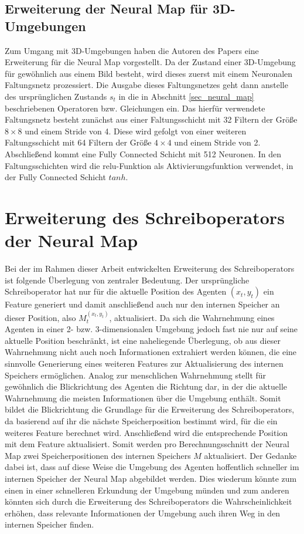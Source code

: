 \subsection{Erweiterung der Neural Map für 3D-Umgebungen}
\label{sec_nm_3d_ext}

Zum Umgang mit 3D-Umgebungen haben die Autoren des Papers eine Erweiterung für die Neural Map vorgestellt. Da der Zustand einer 3D-Umgebung für gewöhnlich aus einem Bild besteht, wird dieses zuerst mit einem Neuronalen Faltungsnetz prozessiert. Die Ausgabe dieses Faltungsnetzes geht dann anstelle des ursprünglichen Zustands $s_t$ in die in Abschnitt \ref{sec_neural_map} beschriebenen Operatoren bzw. Gleichungen ein. Das hierfür verwendete Faltungsnetz besteht zunächst aus einer Faltungsschicht mit 32 Filtern der Größe $8 \times 8$ und einem Stride von 4. Diese wird gefolgt von einer weiteren Faltungsschicht mit 64 Filtern der Größe $4 \times 4$ und einem Stride von 2. Abschließend kommt eine Fully Connected Schicht mit 512 Neuronen. In den Faltungsschichten wird die relu-Funktion als Aktivierungsfunktion verwendet, in der Fully Connected Schicht $tanh$.


\section{Erweiterung des Schreiboperators der Neural Map}
\label{sec_write_ext}

Bei der im Rahmen dieser Arbeit entwickelten Erweiterung des Schreiboperators ist folgende Überlegung von zentraler Bedeutung. Der ursprüngliche Schreiboperator hat nur für die aktuelle Position des Agenten $(x_t,y_t)$ ein Feature generiert und damit anschließend auch nur den internen Speicher an dieser Position, also $M_t^{(x_t,y_t)}$, aktualisiert. Da sich die Wahrnehmung eines Agenten in einer 2- bzw. 3-dimensionalen Umgebung jedoch fast nie nur auf seine aktuelle Position beschränkt, ist eine naheliegende Überlegung, ob aus dieser Wahrnehmung nicht auch noch Informationen extrahiert werden können, die eine sinnvolle Generierung eines weiteren Features zur Aktualisierung des internen Speichers ermöglichen. Analog zur menschlichen Wahrnehmung stellt für gewöhnlich die Blickrichtung des Agenten die Richtung dar, in der die aktuelle Wahrnehmung die meisten Informationen über die Umgebung enthält. Somit bildet die Blickrichtung die Grundlage für die Erweiterung des Schreiboperators, da basierend auf ihr die nächste Speicherposition bestimmt wird, für die ein weiteres Feature berechnet wird. Anschließend wird die entsprechende Position mit dem Feature aktualisiert. Somit werden pro Berechnungsschnitt der Neural Map zwei Speicherpositionen des internen Speichers $M$ aktualisiert. Der Gedanke dabei ist, dass auf diese Weise die Umgebung des Agenten hoffentlich schneller im internen Speicher der Neural Map abgebildet werden. Dies wiederum könnte zum einen in einer schnelleren Erkundung der Umgebung münden und zum anderen könnten sich durch die Erweiterung des Schreiboperators die Wahrscheinlichkeit erhöhen, dass relevante Informationen der Umgebung auch ihren Weg in den internen Speicher finden.

